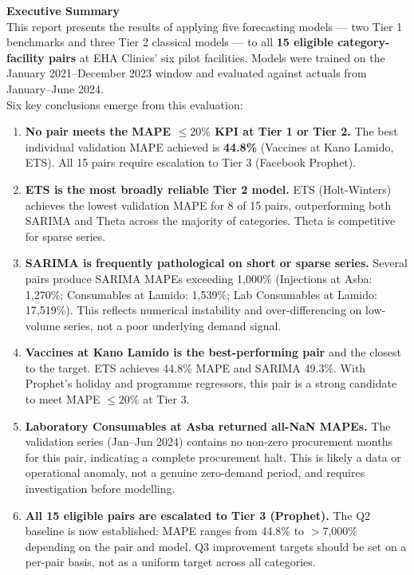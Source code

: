 \documentclass[12pt, a4paper]{article}
\begin{document}
\begin{mdframed}[style=keybox]
\textbf{\large Executive Summary}\\[0.6em]
This report presents the results of applying five forecasting models ---
two Tier 1 benchmarks and three Tier 2 classical models --- to all
\textbf{15 eligible category-facility pairs} at EHA Clinics' six pilot
facilities. Models were trained on the January 2021--December 2023
window and evaluated against actuals from January--June 2024.\\[0.5em]

Six key conclusions emerge from this evaluation:

\begin{enumerate}[leftmargin=1.5em, itemsep=3pt]
  \item \textbf{No pair meets the MAPE $\leq 20\%$ KPI at Tier 1 or Tier 2.}
        The best individual validation MAPE achieved is \textbf{44.8\%}
        (Vaccines at Kano Lamido, ETS). All 15 pairs require escalation
        to Tier 3 (Facebook Prophet).

  \item \textbf{ETS is the most broadly reliable Tier 2 model.}
        ETS (Holt-Winters) achieves the lowest validation MAPE for
        8 of 15 pairs, outperforming both SARIMA and Theta across the
        majority of categories. Theta is competitive for sparse series.

  \item \textbf{SARIMA is frequently pathological on short or sparse series.}
        Several pairs produce SARIMA MAPEs exceeding 1,000\%
        (Injections at Asba: 1,270\%; Consumables at Lamido: 1,539\%;
        Lab Consumables at Lamido: 17,519\%). This reflects numerical
        instability and over-differencing on low-volume series, not a
        poor underlying demand signal.

  \item \textbf{Vaccines at Kano Lamido is the best-performing pair} and
        the closest to the target. ETS achieves 44.8\% MAPE and SARIMA
        49.3\%. With Prophet's holiday and programme regressors, this
        pair is a strong candidate to meet MAPE $\leq 20\%$ at Tier 3.

  \item \textbf{Laboratory Consumables at Asba returned all-NaN MAPEs.}
        The validation series (Jan--Jun 2024) contains no non-zero
        procurement months for this pair, indicating a complete procurement
        halt. This is likely a data or operational anomaly, not a genuine
        zero-demand period, and requires investigation before modelling.

  \item \textbf{All 15 eligible pairs are escalated to Tier 3 (Prophet).}
        The Q2 baseline is now established: MAPE ranges from 44.8\% to
        $>$7,000\% depending on the pair and model. Q3 improvement
        targets should be set on a per-pair basis, not as a uniform
        target across all categories.
\end{enumerate}
\end{mdframed}
\end{document}
